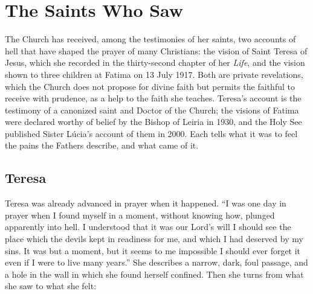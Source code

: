 \section{The Saints Who Saw}

The Church has received, among the testimonies of her saints, two accounts of hell that have shaped the prayer of many Christians: the vision of Saint Teresa of Jesus, which she recorded in the thirty-second chapter of her \emph{Life}, and the vision shown to three children at Fatima on 13 July 1917. Both are private revelations, which the Church does not propose for divine faith but permits the faithful to receive with prudence, as a help to the faith she teaches. Teresa's account is the testimony of a canonized saint and Doctor of the Church; the visions of Fatima were declared worthy of belief by the Bishop of Leiria in 1930, and the Holy See published Sister Lúcia's account of them in 2000. Each tells what it was to feel the pains the Fathers describe, and what came of it.

\subsection{Teresa}

Teresa was already advanced in prayer when it happened. ``I was one day in prayer when I found myself in a moment, without knowing how, plunged apparently into hell. I understood that it was our Lord's will I should see the place which the devils kept in readiness for me, and which I had deserved by my sins. It was but a moment, but it seems to me impossible I should ever forget it even if I were to live many years.'' She describes a narrow, dark, foul passage, and a hole in the wall in which she found herself confined. Then she turns from what she saw to what she felt:

